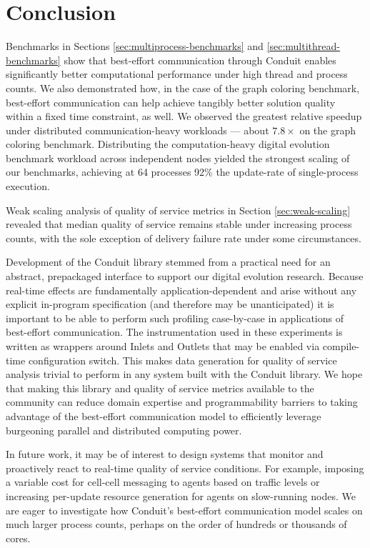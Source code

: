\section{Conclusion}

Benchmarks in Sections \ref{sec:multiprocess-benchmarks} and \ref{sec:multithread-benchmarks} show that best-effort communication through Conduit enables significantly better computational performance under high thread and process counts.
We also demonstrated how, in the case of the graph coloring benchmark, best-effort communication can help achieve tangibly better solution quality within a fixed time constraint, as well.
We observed the greatest relative speedup under distributed communication-heavy workloads --- about $7.8\times$ on the graph coloring benchmark.
Distributing the computation-heavy digital evolution benchmark workload across independent nodes yielded the strongest scaling of our benchmarks, achieving at 64 processes 92\% the update-rate of single-process execution.

Weak scaling analysis of quality of service metrics in Section \ref{sec:weak-scaling} revealed that median quality of service remains stable under increasing process counts, with the sole exception of delivery failure rate under some circumstances.

Development of the Conduit library stemmed from a practical need for an abstract, prepackaged interface to support our digital evolution research.
Because real-time effects are fundamentally application-dependent and arise without any explicit in-program specification (and therefore may be unanticipated) it is important to be able to perform such profiling case-by-case in applications of best-effort communication.
The instrumentation used in these experiments is written as wrappers around Inlets and Outlets that may be enabled via compile-time configuration switch.
This makes data generation for quality of service analysis trivial to perform in any system built with the Conduit library.
We hope that making this library and quality of service metrics available to the community can reduce domain expertise and programmability barriers to taking advantage of the best-effort communication model to efficiently leverage burgeoning parallel and distributed computing power.

In future work, it may be of interest to design systems that monitor and proactively react to real-time quality of service conditions.
For example, imposing a variable cost for cell-cell messaging to agents based on traffic levels or increasing per-update resource generation for agents on slow-running nodes.
We are eager to investigate how Conduit's best-effort communication model scales on much larger process counts, perhaps on the order of hundreds or thousands of cores.
